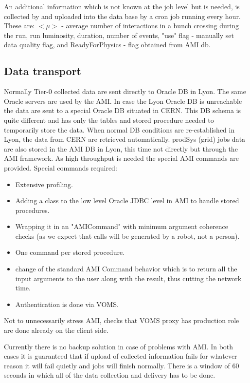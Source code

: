 \documentclass[a4paper]{jpconf}
\begin{document}
An additional information which is not known at the job level but is needed, is collected by and uploaded into the data base by a cron job running every hour. These are: $<{\mu}>$  - average number of interactions in a bunch crossing during the run, run luminosity, duration, number of events, "use" flag - manually set data quality flag, and ReadyForPhysics - flag obtained from AMI db. 
	
		
\subsection{Data transport}

    Normally Tier-0 collected data are sent directly to Oracle DB in Lyon. The same Oracle servers are used by the AMI. In case the Lyon Oracle DB is unreachable the data are sent to a special Oracle DB situated in CERN. This DB schema is quite different and has only the tables and stored procedure needed to temporarily store the data. When normal DB conditions are re-established in Lyon, the data from CERN are retrieved automatically. 
	prodSys (grid) jobs data are also stored in the AMI DB in Lyon, this time not directly but through the AMI framework. As high throughput is needed the special AMI commands are provided. Special commands required: 
\begin{itemize}
	\item Extensive profiling.
	\item Adding a class to the low level Oracle JDBC level in AMI to handle stored procedures.
	\item Wrapping it in an "AMICommand" with minimum argument coherence checks (as we expect that calls will be generated by a robot, not a person).
	\item One command per stored procedure.
	\item change of the standard AMI Command behavior which is to return all the input arguments to the user along with the result, thus cutting the network time. 
	\item Authentication is done via VOMS.
\end{itemize} 
Not to unnecessarily stress AMI, checks that VOMS proxy has production role are done already on the client side. 

Currently there is no backup solution in case of problems with AMI. In both cases it is guaranteed that if upload of collected information fails for whatever reason it will fail quietly and jobs will finish normally. There is a window of 60 seconds in which all of the data collection and delivery has to be done.
\end{document}

